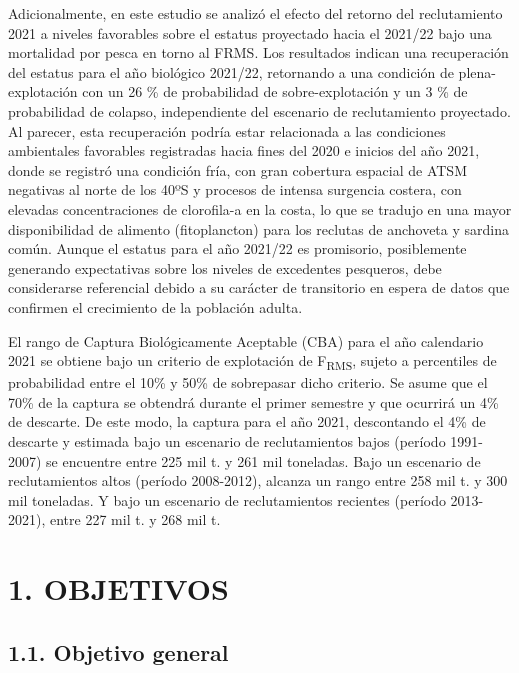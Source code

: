 \documentclass[
  spanish,
]{article}
\begin{document}
Adicionalmente, en este estudio se analizó el efecto del retorno del
reclutamiento 2021 a niveles favorables sobre el estatus proyectado
hacia el 2021/22 bajo una mortalidad por pesca en torno al FRMS. Los
resultados indican una recuperación del estatus para el año biológico
2021/22, retornando a una condición de plena-explotación con un 26 \% de
probabilidad de sobre-explotación y un 3 \% de probabilidad de colapso,
independiente del escenario de reclutamiento proyectado. Al parecer,
esta recuperación podría estar relacionada a las condiciones ambientales
favorables registradas hacia fines del 2020 e inicios del año 2021,
donde se registró una condición fría, con gran cobertura espacial de
ATSM negativas al norte de los 40ºS y procesos de intensa surgencia
costera, con elevadas concentraciones de clorofila-a en la costa, lo que
se tradujo en una mayor disponibilidad de alimento (fitoplancton) para
los reclutas de anchoveta y sardina común. Aunque el estatus para el año
2021/22 es promisorio, posiblemente generando expectativas sobre los
niveles de excedentes pesqueros, debe considerarse referencial debido a
su carácter de transitorio en espera de datos que confirmen el
crecimiento de la población adulta.

El rango de Captura Biológicamente Aceptable (CBA) para el año
calendario 2021 se obtiene bajo un criterio de explotación de
F\textsubscript{RMS}, sujeto a percentiles de probabilidad entre el 10\%
y 50\% de sobrepasar dicho criterio. Se asume que el 70\% de la captura
se obtendrá durante el primer semestre y que ocurrirá un 4\% de
descarte. De este modo, la captura para el año 2021, descontando el 4\%
de descarte y estimada bajo un escenario de reclutamientos bajos
(período 1991-2007) se encuentre entre 225 mil t. y 261 mil toneladas.
Bajo un escenario de reclutamientos altos (período 2008-2012), alcanza
un rango entre 258 mil t. y 300 mil toneladas. Y bajo un escenario de
reclutamientos recientes (período 2013-2021), entre 227 mil t. y 268 mil
t.

\pagebreak
\normalsize

\hypertarget{objetivos}{%
\section{1. OBJETIVOS}\label{objetivos}}

\hypertarget{objetivo-general}{%
\subsection{1.1. Objetivo general}\label{objetivo-general}}
\end{document}
